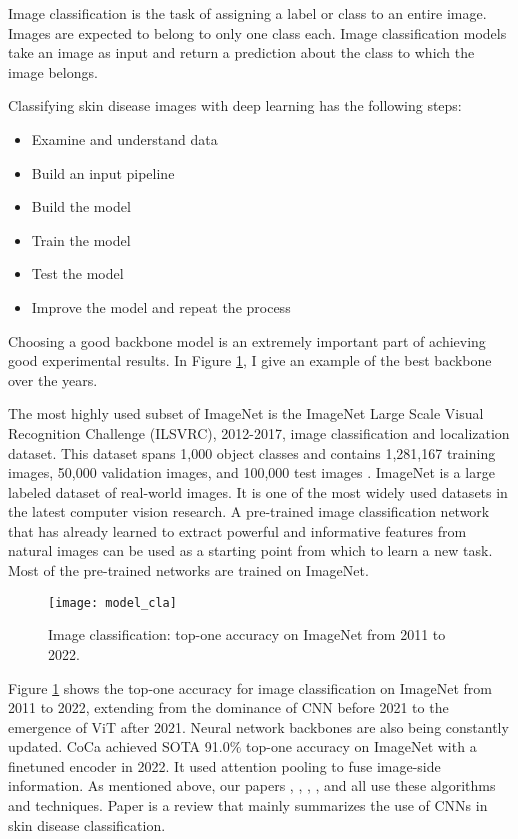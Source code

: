 Image classification is the task of assigning a label or class to an entire image. Images are expected to belong to only one class each. Image classification models take an image as input and return a prediction about the class to which the image belongs.

 Classifying skin disease images with deep learning has the following steps:
\begin{itemize} \label{sec.step}
    \item Examine and understand data
    \item Build an input pipeline
    \item Build the model
    \item Train the model
    \item Test the model
    \item Improve the model and repeat the process
\end{itemize}
Choosing a good backbone model is an extremely important part of achieving good experimental results. In Figure \ref{Fig:model}, I give an example of the best backbone over the years.

The most highly used subset of ImageNet is the ImageNet Large Scale Visual Recognition Challenge (ILSVRC), 2012-2017, image classification and localization dataset. This dataset spans 1,000 object classes and contains 1,281,167 training images, 50,000 validation images, and 100,000 test images \cite{russakovsky2015imagenet}. ImageNet is a large labeled dataset of real-world images. It is one of the most widely used datasets in the latest computer vision research. A pre-trained image classification network that has already learned to extract powerful and informative features from natural images can be used as a starting point from which to learn a new task. Most of the pre-trained networks are trained on ImageNet.

\begin{figure}[!h]
\centering
	\texttt{[image: model\_cla]}
		\caption{Image classification: top-one accuracy on ImageNet from 2011 to 2022\cite{timmurphy.org}.}
		\label{Fig:model} 
\end{figure}


Figure \ref{Fig:model} shows the top-one accuracy for image classification on ImageNet from 2011 to 2022, extending from the dominance of CNN before 2021 to the emergence of ViT after 2021. Neural network backbones are also being constantly updated. CoCa \cite{yu2022coca} achieved SOTA 91.0$\%$ top-one accuracy on ImageNet with a finetuned encoder in 2022. It used attention pooling to fuse image-side information. As mentioned above, our papers \uppercase\expandafter{}, \uppercase\expandafter{}, \uppercase\expandafter{}, \uppercase\expandafter{}, and \uppercase\expandafter{} all use these algorithms and techniques. Paper \uppercase\expandafter{} is a review that mainly summarizes the use of CNNs in skin disease classification.

